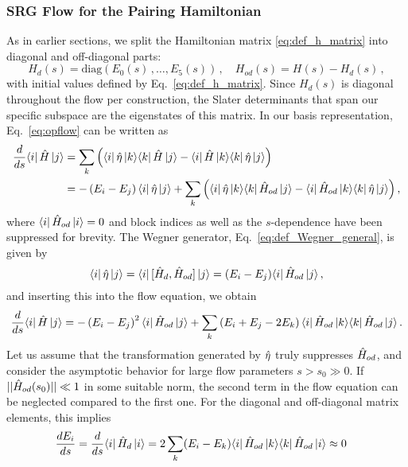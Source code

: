 \subsubsection{SRG Flow for the Pairing Hamiltonian}
As in earlier sections, we split the Hamiltonian matrix \eqref{eq:def_h_matrix}
into diagonal and off-diagonal parts:
\begin{equation}
  H_d(s) = \mathrm{diag}(E_0(s)\,,\ldots,E_5(s))\,,\quad H_{od}(s) = H(s) - H_{d}(s)\,,
\end{equation}
with initial values defined by Eq.~\eqref{eq:def_h_matrix}. Since $H_d(s)$
is diagonal throughout the flow per construction, the Slater determinants
that span our specific subspace are the eigenstates of this matrix. In our 
basis representation, Eq.~\eqref{eq:opflow} can be written as
\begin{align}
   \frac{d {}} {d {s}} \langle{i}|\,{\hat{H}}\,|{j}\rangle
  &=\sum_k\left(\langle{i}|\,{\hat{\eta}}\,|{k}\rangle\langle{k}|\,{\hat{H}}\,|{j}\rangle-\langle{i}|\,{\hat{H}}\,|{k}\rangle\langle{k}|\,{\hat{\eta}}\,|{j}\rangle\right)\notag\\
  &=-\left(E_i-E_j\right)\langle{i}|\,{\hat{\eta}}\,|{j}\rangle
    +\sum_k\left(\langle{i}|\,{\hat{\eta}}\,|{k}\rangle\langle{k}|\,{\hat{H}_{od}}\,|{j}\rangle-\langle{i}|\,{\hat{H}_{od}}\,|{k}\rangle\langle{k}|\,{\hat{\eta}}\,|{j}\rangle\right),
\end{align}
where $\langle{i}|\,{\hat{H}_{od}}\,|{i}\rangle=0$ and block indices as well as the $s$-dependence
have been suppressed for brevity. The Wegner generator, Eq.~\eqref{eq:def_Wegner_general}, 
is given by
\begin{equation}
  \langle{i}|\,{\hat{\eta}}\,|{j}\rangle=\langle{i}|\,{[{\hat{H}_d},{\hat{H}_{od}}]}\,|{j}\rangle=(E_i-E_j)\langle{i}|\,{\hat{H}_{od}}\,|{j}\rangle\,,
\end{equation}
and inserting this into the flow equation, we obtain
\begin{align}
  \totd{}{s}\matrixe{i}{\HO}{j}
  =-\left(E_i-E_j\right)^2\matrixe{i}{\HO_{od}}{j}
  +\sum_k\left(E_i+E_j-2E_k\right)\matrixe{i}{\HO_{od}}{k}\matrixe{k}{\HO_{od}}{j}\,.\label{eq:schema_wegner}
\end{align}
Let us assume that the transformation generated by $\hat{\eta}$ truly suppresses 
$\hat{H}_{od}$, and consider the asymptotic behavior for large flow parameters 
$s>s_0\gg0$. If $||\hat{H}_{od}(s_0)||\ll 1$ in some suitable norm, the second 
term in the flow equation can be neglected compared to the first one. For
the diagonal and off-diagonal matrix elements, this implies
\begin{align}
   \frac{d {E_i}} {d {s}}  &=  \frac{d {}} {d {s}}  \langle{i}|\,{\hat{H}_d}\,|{i}\rangle = 2\sum_k (E_i - E_k) \langle{i}|\,{\hat{H}_{od}}\,|{k}\rangle\langle{k}|\,{\hat{H}_{od}}\,|{i}\rangle
  \approx0
\end{align}
